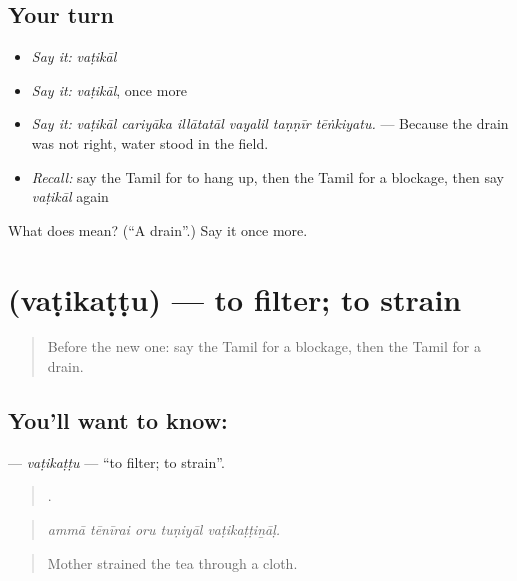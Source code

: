 \subsection*{Your turn}
\begin{itemize}
\raggedright
  \item \emph{Say it:} \emph{vaṭikāl}
  \item \emph{Say it:} \emph{vaṭikāl}, once more
  \item \emph{Say it:} \emph{vaṭikāl cariyāka illātatāl vayalil taṇṇīr tēṅkiyatu.} — Because the drain was not right, water stood in the field.
  \item \emph{Recall:} say the Tamil for to hang up, then the Tamil for a blockage, then say \emph{vaṭikāl} again
\end{itemize}

\begin{tcolorbox}[breakable,colback=teal!4,colframe=teal!35!black,title={Before you move on}]
What does  mean? (\textquotedblleft{}A drain\textquotedblright{}.) Say it once more.
\end{tcolorbox}
\section[\texorpdfstring{\ta{வடிகட்டு} (vaṭikaṭṭu)}{வடிகட்டு (vaṭikaṭṭu)}]{ (vaṭikaṭṭu) — to filter; to strain}

\label{lesson:TA-C523-vatikattu}



\begin{quote}
Before the new one: say the Tamil for a blockage, then the Tamil for a drain.
\end{quote}

\subsection*{You'll want to know: }
\textbf{} — \emph{vaṭikaṭṭu} — \textquotedblleft{}to filter; to strain\textquotedblright{}.

\begin{quote}
    .
\end{quote}

\begin{quote}
\emph{ammā tēnīrai oru tuṇiyāl vaṭikaṭṭiṉāḷ.}
\end{quote}

\begin{quote}
Mother strained the tea through a cloth.
\end{quote}

